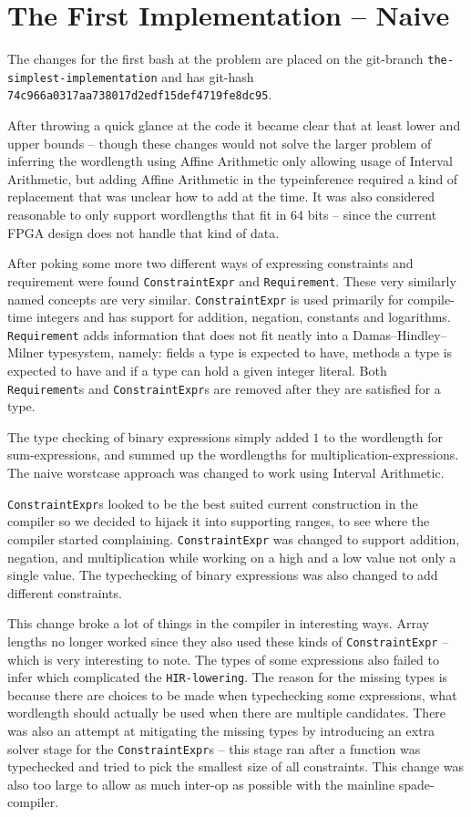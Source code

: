 \documentclass[msc,lith,english]{liuthesis}
\begin{document}
\section{The First Implementation -- Naive}
\label{sec:First}
The changes for the first bash at the problem are placed on the git-branch \verb+the-simplest-implementation+ and has git-hash \verb+74c966a0317aa738017d2edf15def4719fe8dc95+.

After throwing a quick glance at the code it became clear that at least lower and upper bounds -- though these changes would not solve the larger problem of inferring the wordlength using Affine Arithmetic only allowing usage of Interval Arithmetic, but adding Affine Arithmetic in the typeinference required a kind of replacement that was unclear how to add at the time. It was also considered reasonable to only support wordlengths that fit in 64 bits -- since the current FPGA design does not handle that kind of data.

After poking some more two different ways of expressing constraints and requirement were found \verb+ConstraintExpr+ and \verb+Requirement+. These very similarly named concepts are very similar. \verb+ConstraintExpr+ is used primarily for compile-time integers and has support for addition, negation, constants and logarithms. \verb+Requirement+ adds information that does not fit neatly into a Damas–Hindley–Milner typesystem, namely: fields a type is expected to have, methods a type is expected to have and if a type can hold a given integer literal. Both \verb+Requirement+s and \verb+ConstraintExpr+s are removed after they are satisfied for a type.

The type checking of binary expressions simply added $1$ to the wordlength for sum-expressions, and summed up the wordlengths for multiplication-expressions. The naive worstcase approach was changed to work using Interval Arithmetic. 

\verb+ConstraintExpr+s looked to be the best suited current construction in the compiler so we decided to hijack it into supporting ranges, to see where the compiler started complaining. \verb+ConstraintExpr+ was changed to support addition, negation, and multiplication while working on a high and a low value not only a single value. The typechecking of binary expressions was also changed to add different constraints.

This change broke a lot of things in the compiler in interesting ways. Array lengths no longer worked since they also used these kinds of \verb+ConstraintExpr+ -- which is very interesting to note. The types of some expressions also failed to infer which complicated the \verb+HIR-lowering+. The reason for the missing types is because there are choices to be made when typechecking some expressions, what wordlength should actually be used when there are multiple candidates. There was also an attempt at mitigating the missing types by introducing an extra solver stage for the \verb+ConstraintExpr+s -- this stage ran after a function was typechecked and tried to pick the smallest size of all constraints. This change was also too large to allow as much inter-op as possible with the mainline spade-compiler.
\end{document}

